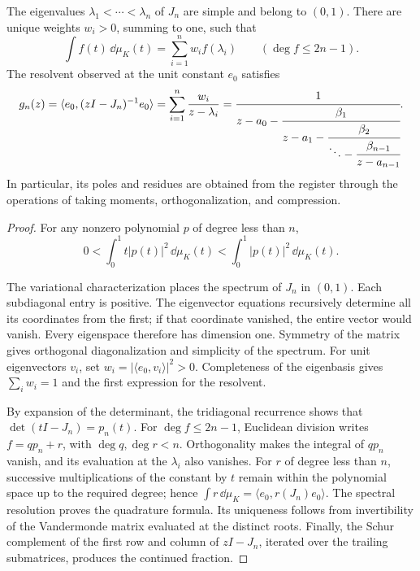 \begin{theorem}
\label{thm:jacobi-residues}
The eigenvalues \(\lambda_1<\cdots<\lambda_n\) of \(J_n\) are
simple and belong to \((0,1)\). There are unique weights \(w_i>0\),
summing to one, such that
\begin{equation}
 \int f(t)\,\dd\mu_K(t)=\sum_{i=1}^{n}w_i f(\lambda_i)
 \qquad(\deg f\leq2n-1).
 \label{eq:jacobi-quadrature}
\end{equation}
The resolvent observed at the unit constant \(e_0\) satisfies
\begin{equation}
 g_n(z)=\langle e_0,(zI-J_n)^{-1}e_0\rangle
       =\sum_{i=1}^{n}\frac{w_i}{z-\lambda_i}
       =\cfrac1{z-a_0-\cfrac{\beta_1}{z-a_1-
          \cfrac{\beta_2}{\ddots-\cfrac{\beta_{n-1}}{z-a_{n-1}}}}}.
 \label{eq:jacobi-resolvent}
\end{equation}
In particular, its poles and residues are obtained from the register
through the operations of taking moments, orthogonalization, and
compression.
\end{theorem}
\begin{proof}
For any nonzero polynomial \(p\) of degree less than \(n\),
\[
 0<\int_0^1 t|p(t)|^2\,\dd\mu_K(t)
   <\int_0^1 |p(t)|^2\,\dd\mu_K(t).
\]

The variational characterization places the spectrum of \(J_n\) in
\((0,1)\). Each subdiagonal entry is positive. The eigenvector
equations recursively determine all its coordinates from the first;
if that coordinate vanished, the entire vector would vanish. Every
eigenspace therefore has dimension one. Symmetry of the matrix gives
orthogonal diagonalization and simplicity of the spectrum. For unit
eigenvectors \(v_i\), set \(w_i=|\langle e_0,v_i\rangle|^2>0\).
Completeness of the eigenbasis gives \(\sum_iw_i=1\) and the first
expression for the resolvent.

By expansion of the determinant, the tridiagonal recurrence shows that
\(\det(tI-J_n)=p_n(t)\). For \(\deg f\leq2n-1\), Euclidean
division writes \(f=qp_n+r\), with \(\deg q,\deg r<n\).
Orthogonality makes the integral of \(qp_n\) vanish, and its
evaluation at the \(\lambda_i\) also vanishes. For \(r\) of degree
less than \(n\), successive multiplications of the constant by \(t\)
remain within the polynomial space up to the required degree; hence
\(\int r\,\dd\mu_K=\langle e_0,r(J_n)e_0\rangle\).
The spectral resolution proves the quadrature formula. Its uniqueness
follows from invertibility of the Vandermonde matrix evaluated at the
distinct roots. Finally, the Schur complement of the first row and
column of \(zI-J_n\), iterated over the trailing submatrices,
produces the continued fraction.
\end{proof}

